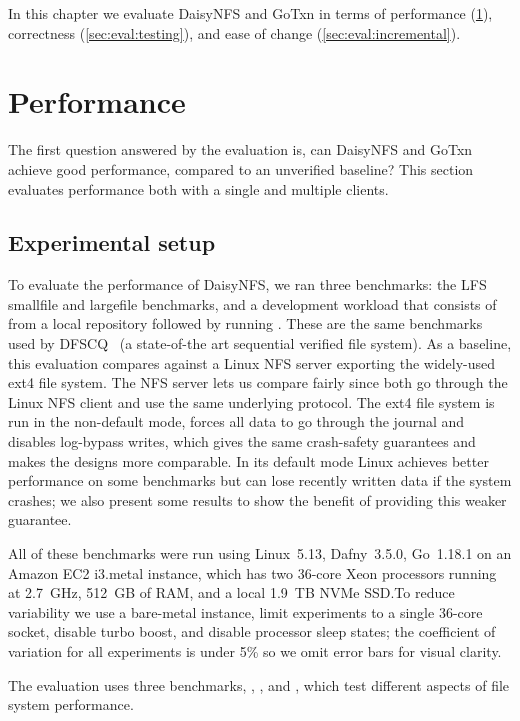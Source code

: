 In this chapter we evaluate DaisyNFS and GoTxn in terms of performance
(\cref{sec:eval:perf}), correctness (\cref{sec:eval:testing}),
and ease of change (\cref{sec:eval:incremental}).

\section{Performance}
\label{sec:eval:perf}

The first question answered by the evaluation is, can DaisyNFS and GoTxn achieve
good performance, compared to an unverified baseline? This section evaluates
performance both with a single and multiple clients.

\subsection{Experimental setup}

To evaluate the performance of DaisyNFS, we ran three benchmarks: the LFS smallfile
and largefile benchmarks, and a development workload that consists of  from a local repository followed by running . These are the same
benchmarks used by DFSCQ~\cite{chen:dfscq} (a state-of-the art sequential
verified file system). As a baseline, this evaluation compares against a Linux
NFS server exporting the widely-used ext4 file system.
The NFS server lets us compare fairly since both go through the Linux NFS client
and use the same underlying protocol. The ext4 file system is run in the
non-default  mode, forces all data to
go through the journal and disables log-bypass writes, which gives the same
crash-safety guarantees and makes the designs more comparable. In its default
 mode Linux achieves better performance on some benchmarks but
can lose recently written data if the system crashes; we also present some results to
show the benefit of providing this weaker guarantee.

All of these benchmarks were run using Linux~5.13, Dafny~3.5.0, Go~1.18.1 on an Amazon
EC2 i3.metal instance, which has two 36-core Xeon processors running at 2.7~GHz, 512~GB of RAM, and a local 1.9~TB
NVMe SSD.\@ To reduce variability we use a bare-metal instance, limit experiments to a single 36-core
socket, disable turbo boost, and disable processor sleep states; the coefficient
of variation for all experiments is under 5\% so we omit error bars for visual
clarity.

\vspace{\baselineskip}
The evaluation uses three benchmarks, , , and
, which test different aspects of file system performance.
\vspace{-\baselineskip}

